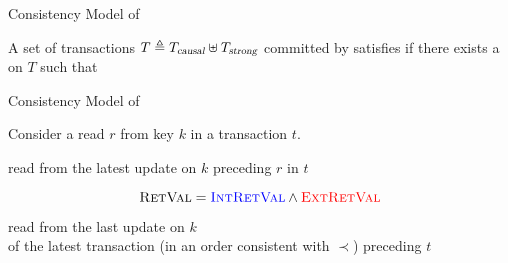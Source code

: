 \begin{frame}{Consistency Model of \unistore}
  \begin{definition}[\por]
    A set of transactions $T \triangleq T_{\textsl{causal}} \uplus T_{\textsl{strong}}$
    committed by \unistore{} satisfies \blue{\por{}}
    if there exists a  on $T$ such that

    \vspace{0.30cm}
    \begin{description}[\ev:]
      \setlength{\itemsep}{8pt}
      \item[\causalityaxiom:]
      \item[\conflictaxiom:]
      \item[\ev:]
      \item[\retval:]
    \end{description}
  \end{definition}
\end{frame}

\begin{frame}{Consistency Model of \unistore}
  \begin{center}
    Consider a read $r$ from key $k$ in a transaction $t$.

    \vspace{0.80cm}
    \blue{$\intretval:$} read from the latest update on $k$ preceding $r$ in $t$

    \[
      \textsc{RetVal} = \textcolor{blue}{\textsc{IntRetVal}} \land \textcolor{red}{\textsc{ExtRetVal}}
    \]

    \vspace{0.50cm}
    \red{$\extretval:$} read from the last update on $k$ \\[3pt]
    of the latest transaction (in an order consistent with $\prec$) preceding $t$
  \end{center}
\end{frame}

